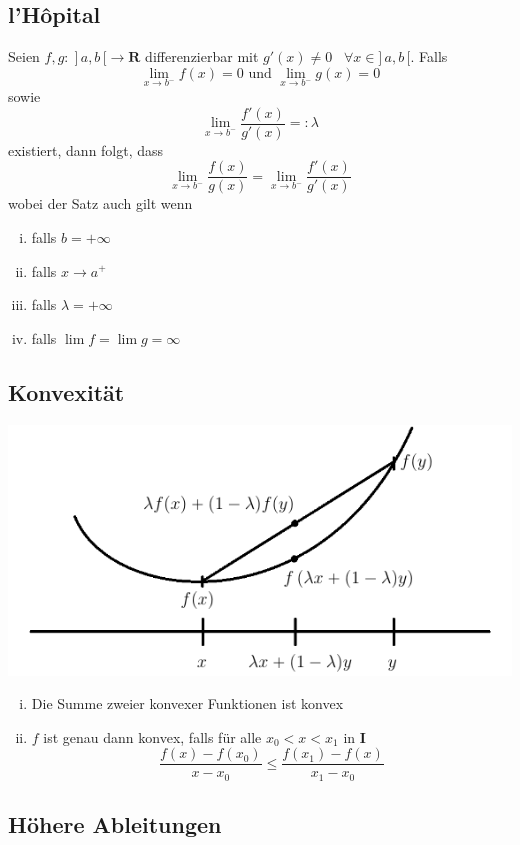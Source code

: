 \documentclass[8pt]{article}
\begin{document}
\begin{multicols*}{3}
\subsection{l'Hôpital}

Seien $f, g: \; ]\,a, b\,[ \rightarrow \mathbf{R}$ differenzierbar mit $g'(x) \neq 0 \;\;\; \forall x \in ]\,a, b\,[$.
Falls $$\lim_{x \rightarrow b^-} f(x) = 0 \text{ und } \lim_{x \rightarrow b^-} g(x) = 0$$
sowie $$\lim_{x \rightarrow b^-} \frac{f'(x)}{g'(x)} =: \lambda$$ existiert, dann folgt, dass
$$\lim_{x \rightarrow b^-} \frac{f(x)}{g(x)} = \lim_{x \rightarrow b^-} \frac{f'(x)}{g'(x)}$$
wobei der Satz auch gilt wenn
\begin{enumerate}[(i)]
  \item falls $b = +\infty$
  \item falls $x \rightarrow a^+$
  \item falls $\lambda = +\infty$
  \item falls $\lim f = \lim g = \infty$
\end{enumerate}

\subsection{Konvexität}
\begin{center}
  \includegraphics[scale=0.4]{konvex.png}
\end{center}
\begin{enumerate}[(i)]
  \item Die Summe zweier konvexer Funktionen ist konvex
  \item $f$ ist genau dann konvex, falls für alle $x_0 < x < x_1$ in $\mathbf{I}$
  $$
    \frac{f(x) - f(x_0)}{x - x_0} \leq \frac{f(x_1) - f(x)}{x_1 - x_0}
  $$
\end{enumerate}

\subsection{Höhere Ableitungen}


\end{multicols*}
\end{document}
